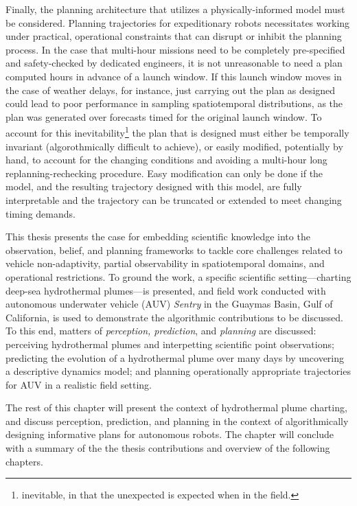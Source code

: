 Finally, the planning architecture that utilizes a physically-informed model must be considered.
Planning trajectories for expeditionary robots necessitates working under practical, operational constraints that can disrupt or inhibit the planning process.
In the case that multi-hour missions need to be completely pre-specified and safety-checked by dedicated engineers, it is not unreasonable to need a plan computed hours in advance of a launch window. 
If this launch window moves in the case of weather delays, for instance, just carrying out the plan as designed could lead to poor performance in sampling spatiotemporal distributions, as the plan was generated over forecasts timed for the original launch window.
To account for this inevitability\footnote{inevitable, in that the unexpected is expected when in the field.} the plan that is designed must either be temporally invariant (algorothmically difficult to achieve), or easily modified, potentially by hand, to account for the changing conditions and avoiding a multi-hour long replanning-rechecking procedure.
Easy modification can only be done if the model, and the resulting trajectory designed with this model, are fully interpretable and the trajectory can be truncated or extended to meet changing timing demands.

This thesis presents the case for embedding scientific knowledge into the observation, belief, and planning frameworks to tackle core challenges related to vehicle non-adaptivity, partial observability in spatiotemporal domains, and operational restrictions. 
To ground the work, a specific scientific setting---charting deep-sea hydrothermal plumes---is presented, and field work conducted with autonomous underwater vehicle (AUV) \emph{Sentry} in the Guaymas Basin, Gulf of California, is used to demonstrate the algorithmic contributions to be discussed.  
To this end, matters of \emph{perception, prediction}, and \emph{planning} are discussed: perceiving hydrothermal plumes and interpetting scientific point observations; predicting the evolution of a hydrothermal plume over many days by uncovering a descriptive dynamics model; and planning operationally appropriate trajectories for AUV \Sentry in a realistic field setting.

The rest of this chapter will present the context of hydrothermal plume charting, and discuss perception, prediction, and planning in the context of algorithmically designing informative plans for autonomous robots.
The chapter will conclude with a summary of the the thesis contributions and overview of the following chapters.


